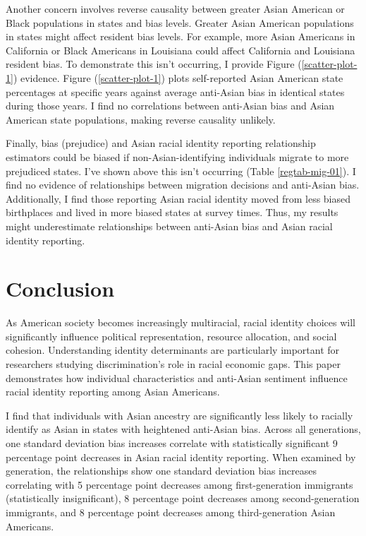 Another concern involves reverse causality between greater Asian American or Black populations in states and bias levels. Greater Asian American populations in states might affect resident bias levels. For example, more Asian Americans in California or Black Americans in Louisiana could affect California and Louisiana resident bias. To demonstrate this isn't occurring, I provide Figure (\ref{scatter-plot-1}) evidence. Figure (\ref{scatter-plot-1}) plots self-reported Asian American state percentages at specific years against average anti-Asian bias in identical states during those years. I find no correlations between anti-Asian bias and Asian American state populations, making reverse causality unlikely.

Finally, bias (prejudice) and Asian racial identity reporting relationship estimators could be biased if non-Asian-identifying individuals migrate to more prejudiced states. I've shown above this isn't occurring (Table \ref{regtab-mig-01}). I find no evidence of relationships between migration decisions and anti-Asian bias. Additionally, I find those reporting Asian racial identity moved from less biased birthplaces and lived in more biased states at survey times. Thus, my results might underestimate relationships between anti-Asian bias and Asian racial identity reporting.

\section{Conclusion}\label{sec:conc}

As American society becomes increasingly multiracial, racial identity choices will significantly influence political representation, resource allocation, and social cohesion. Understanding identity determinants are particularly important for researchers studying discrimination's role in racial economic gaps. This paper demonstrates how individual characteristics and anti-Asian sentiment influence racial identity reporting among Asian Americans.

I find that individuals with Asian ancestry are significantly less likely to racially identify as Asian in states with heightened anti-Asian bias. Across all generations, one standard deviation bias increases correlate with statistically significant 9 percentage point decreases in Asian racial identity reporting. When examined by generation, the relationships show one standard deviation bias increases correlating with 5 percentage point decreases among first-generation immigrants (statistically insignificant), 8 percentage point decreases among second-generation immigrants, and 8 percentage point decreases among third-generation Asian Americans.

